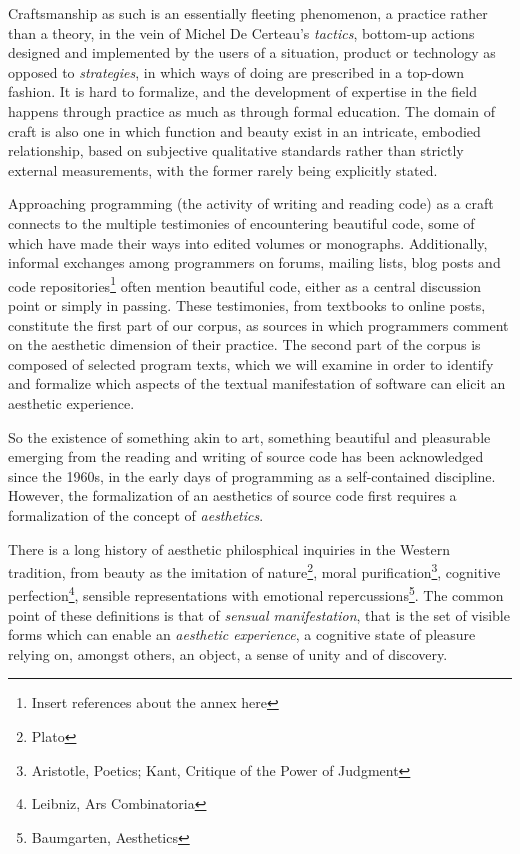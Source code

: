 Craftsmanship as such is an essentially fleeting phenomenon, a practice rather than a theory, in the vein of Michel De Certeau's \textit{tactics}, bottom-up actions designed and implemented by the users of a situation, product or technology as opposed to \textit{strategies}\cite{certeau_invention_1990}, in which ways of doing are prescribed in a top-down fashion. It is hard to formalize, and the development of expertise in the field happens through practice as much as through formal education\cite{sennett_craftsman_2009}. The domain of craft is also one in which function and beauty exist in an intricate, embodied relationship, based on subjective qualitative standards rather than strictly external measurements, with the former rarely being explicitly stated\cite{pye_nature_2008}.

Approaching programming (the activity of writing and reading code) as a craft\cite{levy_programmation_1992} connects to the multiple testimonies of encountering beautiful code, some of which have made their ways into edited volumes or monographs\cite{oram_beautiful_2007,chandra_geek_2014,gabriel_patterns_1998}. Additionally, informal exchanges among programmers on forums, mailing lists, blog posts and code repositories\footnote{Insert references about the annex here} often mention beautiful code, either as a central discussion point or simply in passing. These testimonies, from textbooks to online posts, constitute the first part of our corpus, as sources in which programmers comment on the aesthetic dimension of their practice. The second part of the corpus is composed of selected program texts, which we will examine in order to identify and formalize which aspects of the textual manifestation of software can elicit an aesthetic experience.

So the existence of something akin to art, something beautiful and pleasurable emerging from the reading and writing of source code has been acknowledged since the 1960s, in the early days of programming as a self-contained discipline. However, the formalization of an aesthetics of source code first requires a formalization of the concept of \emph{aesthetics}.

There is a long history of aesthetic philosphical inquiries in the Western tradition, from beauty as the imitation of nature\footnote{Plato}, moral purification\footnote{Aristotle, Poetics; Kant, Critique of the Power of Judgment}, cognitive perfection\footnote{Leibniz, Ars Combinatoria}, sensible representations with emotional repercussions\footnote{Baumgarten, Aesthetics}. The common point of these definitions is that of \emph{sensual manifestation}, that is the set of visible forms which can enable an \emph{aesthetic experience}, a cognitive state of pleasure relying on, amongst others, an object, a sense of unity and of discovery\cite{beardsley_aesthetic_1970}.

